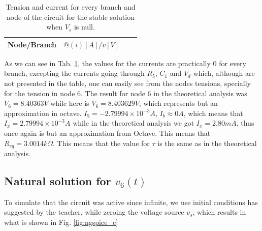    \begin{table}[H]
    \centering
    \small
    \begin{tabular}{|c|c|c|c|}
          \hline
          Node/Branch & $@(i) [A]/ v [V]$\\
          \hline
          
          \hline
    \end{tabular}
    \caption{Tension and current for every branch and node of the circuit for the stable solution when $V_s$ is null.}
    \label{tab:ngs_tau}
    \end{table}
As we can see in Tab. \ref{tab:ngs_tau}, the values for the currents are practically 0 for every branch, excepting the currents going through $R_5$, $C_1$ and $V_d$ which, although are not presented in the table, one can easily see from the nodes tensions, specially for the tension in node 6. The result for node 6 in the theoretical analysis was $V_6 = 8.40363V$ while here is $V_6 = 8.403629V$, which represents but an approximation in octave. $I_5 = -2.79994\times 10^{-3} A$, $I_b \approx 0 A$, which means that $I_x = 2.79994\times 10^{-3} A$ while in the theoretical analysis we got $I_x = 2.80mA$, thus once again is but an approximation from Octave. This means that $R_{eq} = 3.0014k\Omega$. This means that the value for $\tau$ is the same as in the theoretical analysis.

\subsection{Natural solution for $v_6(t)$}

To simulate that the circuit was active since infinite, we use initial conditions has suggested by the teacher, while zeroing the voltage source $v_s$, which results in what is shown in Fig. \ref{fig:ngspice_c}

